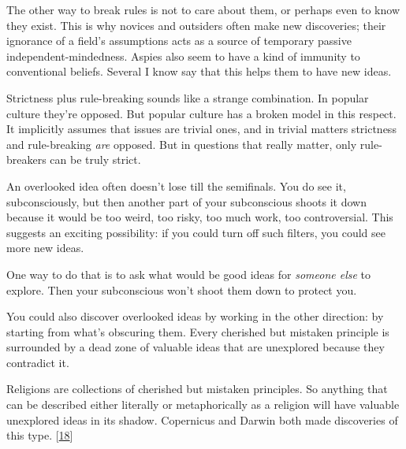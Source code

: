 The other way
                  to break rules is not to care about them, or perhaps even to
                  know they exist. This is why novices and outsiders often make
                  new discoveries; their ignorance of a field's assumptions acts
                  as a source of temporary passive independent-mindedness.
                  Aspies also seem to have a kind of immunity to conventional
                  beliefs. Several I know say that this helps them to have new
                  ideas.

Strictness plus rule-breaking sounds like a
                  strange combination. In popular culture they're opposed. But
                  popular culture has a broken model in this respect. It
                  implicitly assumes that issues are trivial ones, and in
                  trivial matters strictness and rule-breaking
                  \emph{are} opposed. But in questions that really matter, only
                  rule-breakers can be truly strict.






                  An overlooked idea often doesn't lose till the semifinals. You
                  do see it, subconsciously, but then another part of your
                  subconscious shoots it down because it would be too weird, too
                  risky, too much work, too controversial. This suggests an
                  exciting possibility: if you could turn off such filters, you
                  could see more new ideas.

One way to do that is to
                  ask what would be good ideas for \emph{someone else} to
                  explore. Then your subconscious won't shoot them down to
                  protect you.

You could also discover overlooked
                  ideas by working in the other direction: by starting from
                  what's obscuring them. Every cherished but mistaken principle
                  is surrounded by a dead zone of valuable ideas that are
                  unexplored because they contradict it.

Religions
                  are collections of cherished but mistaken principles. So
                  anything that can be described either literally or
                  metaphorically as a religion will have valuable unexplored
                  ideas in its shadow. Copernicus and Darwin both made
                  discoveries of this type.
                  [\href{\#f18n}{18}]


